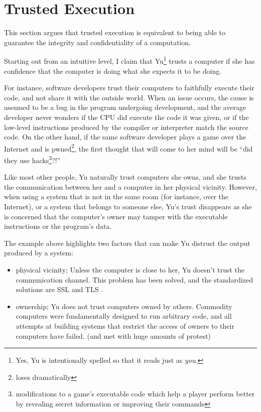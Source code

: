 \section{Trusted Execution}\label{concepts:trusted_execution}
This section argues that trusted execution is equivalent to being able to
guarantee the integrity and confidentiality of a computation.

Starting out from an intuitive level, I claim that Yu\footnote{Yes, Yu
is intentionally spelled so that it reads just as \textit{you}.} trusts a
computer if she has confidence that the computer is doing what she expects it
to be doing.

For instance, software developers trust their computers to faithfully execute
their code, and not share it with the outside world. When an issue occurs, the
cause is assumed to be a bug in the program undergoing development, and the
average developer never wonders if the CPU did execute the code it was
given, or if the low-level instructions produced by the compiler or interpreter
match the source code. On the other hand, if the same software developer plays
a game over the Internet and is pwned\footnote{loses dramatically}, the first thought that will come to
her mind will be ``did they use hacks\footnote{modifications to a game's
executable code which help a player perform better by revealing secret
information or improving their commands}?!''

Like most other people, Yu naturally trust computers she owns, and she trusts
the communication between her and a computer in her physical vicinity. However,
when using a system that is not in the same room (for instance, over the
Internet), or a system that belongs to someone else, Yu's trust disappears  as
she is concerned that the computer's owner may tamper with the executable
instructions or the program's data.

The example above highlights two factors that can make Yu distrust the output
produced by a system:
\begin{itemize}
  \item {physical vicinity;} Unless the computer is close to her, Yu doesn't
  trust the communication channel. This problem has been solved, and the
  standardized solutions are SSL \cite{freier1996ssl} and TLS
  \cite{dierks1999tpv}.
  \item {ownership;} Yu does not trust computers owned by others.
  Commodity computers were fundamentally designed to run arbitrary code, and all
  attempts at building systems that restrict the access of owners to their
  computers have failed. (and met with huge amounts of protest)
\end{itemize}

